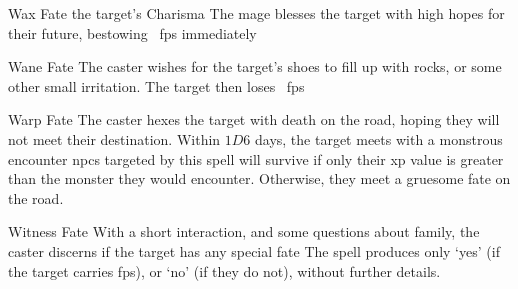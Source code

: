   {}%
  {Wax}%
  {Fate}%
  {the target's Charisma}%
  {The mage blesses the target with high hopes for their future, bestowing ~\glspl{fp} immediately}%
  {}

  {}%
  {Wane}%
  {Fate}%
  {}%
  {The caster wishes for the target's shoes to fill up with rocks, or some other small irritation.
    The target then loses \showDam~\glspl{fp}}%
  {}


  {}%
  {Warp}%
  {Fate}%
  {}%
  {The caster hexes the target with death on the road, hoping they will not meet their destination.
    Within $1D6$ days, the target meets with a monstrous encounter}%
  {
    \Glspl{npc} targeted by this spell will survive if only their \gls{xp} value is greater than the monster they would encounter.
    Otherwise, they meet a gruesome fate on the road.
  }

  {}%
  {Witness}%
  {Fate}%
  {}%
  {With a short interaction, and some questions about family, the caster discerns if the target has any special fate}%
  {The spell produces only `yes' (if the target carries \glspl{fp}), or `no' (if they do not), without further details.}

